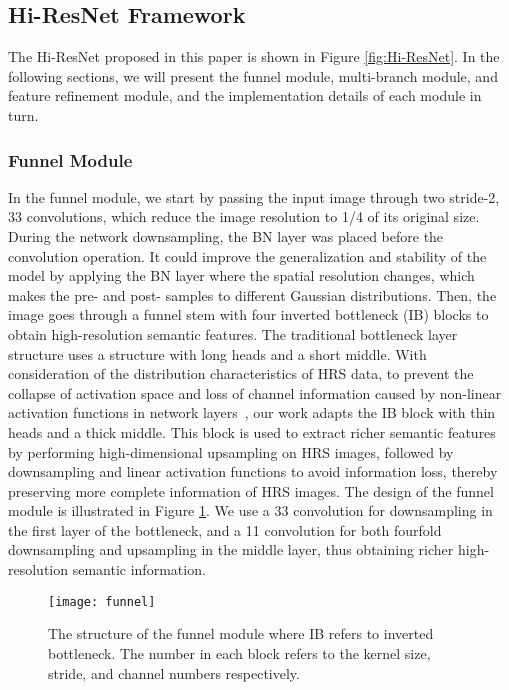 \documentclass[journal]{IEEEtran}
\begin{document}
\subsection{Hi-ResNet Framework}
The Hi-ResNet proposed in this paper is shown in Figure \ref{fig:Hi-ResNet}. In the following sections, we will present the funnel module, multi-branch module, and feature refinement module, and the implementation details of each module in turn.

\subsubsection{Funnel Module}
In the funnel module, we start by passing the input image through two stride-2, 33 convolutions, which reduce the image resolution to 1/4 of its original size. During the network downsampling, the BN layer was placed before the convolution operation. It could improve the generalization and stability of the model by applying the BN layer where the spatial resolution changes, which makes the pre- and post- samples to different Gaussian distributions. Then, the image goes through a funnel stem with four inverted bottleneck (IB) blocks to obtain high-resolution semantic features. The traditional bottleneck layer structure uses a structure with long heads and a short middle. With consideration of the distribution characteristics of HRS data, to prevent the collapse of activation space and loss of channel information caused by non-linear activation functions in network layers~\cite{sandler2018mobilenetv2}, our work adapts the IB block with thin heads and a thick middle. This block is used to extract richer semantic features by performing high-dimensional upsampling on HRS images, followed by downsampling and linear activation functions to avoid information loss, thereby preserving more complete information of HRS images. The design of the funnel module is illustrated in Figure \ref{fig:funnel}. We use a 33 convolution for downsampling in the first layer of the bottleneck, and a 11 convolution for both fourfold downsampling and upsampling in the middle layer, thus obtaining richer high-resolution semantic information.

\begin{figure}[!ht]
    \centering
    \texttt{[image: funnel]}
    \caption{The structure of the funnel module where IB refers to inverted bottleneck. The number in each block refers to the kernel size, stride, and channel numbers respectively.}
    \label{fig:funnel}
\end{figure}
\end{document}
